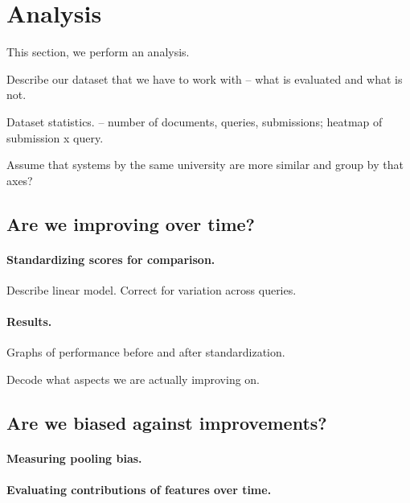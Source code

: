 \section{Analysis}
\label{sec:analysis}

This section, we perform an analysis.

Describe our dataset that we have to work with -- what is evaluated and what is not.

Dataset statistics. -- number of documents, queries, submissions; heatmap of submission x query.

Assume that systems by the same university are more similar and group by that axes?

\subsection{Are we improving over time?}

\paragraph{Standardizing scores for comparison.}

Describe linear model.
Correct for variation across queries.

\paragraph{Results.}

Graphs of performance before and after standardization.

Decode what aspects we are actually improving on.

\subsection{Are we biased against improvements?}

\paragraph{Measuring pooling bias.}

\paragraph{Evaluating contributions of features over time.}

